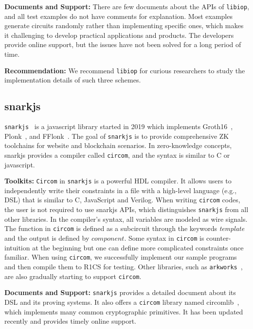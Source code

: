 \documentclass[letterpaper,twocolumn,10pt]{article}
\theoremstyle{definition}
\newcommand{\mypara}[1]{\noindent\textbf{{#1: }}}
\newcommand{\zk}{\text{zk-SNARK}\xspace}
\newcommand{\new}[1]{{#1}\xspace}
\newcommand{\lib}[1]{\texttt{#1}\xspace}
\begin{document}
\mypara{Documents and Support} There are few documents about the APIs of \lib{libiop}, and all test examples do not have comments for explanation. Most examples generate circuits randomly rather than implementing specific ones, which makes it challenging to develop practical applications and products. The developers provide online support, but the issues have not been solved for a long period of time.

\mypara{Recommendation} We recommend \lib{libiop} for curious researchers to study the implementation details of such three schemes.

\subsection{snarkjs}
\lib{snarkjs}~\cite{snarkjs} is a javascript library started in 2019 which implements Groth16~\cite{groth2016size}, Plonk~\cite{gabizon2019plonk}, and FFlonk~\cite{gabizon2021fflonk}. The goal of \lib{snarkjs} is to provide comprehensive ZK toolchains for website and blockchain scenarios. In zero-knowledge concepts, snarkjs provides a compiler called \texttt{circom}, and the syntax is similar to C or javascript. 

\mypara{Toolkits} \texttt{Circom} in \lib{snarkjs} is a powerful HDL compiler. It allows users to independently write their constraints in a file with a high-level language (e.g., DSL) that is similar to C, JavaScript and Verilog. When writing \texttt{circom} codes, the user is not required to use snarkjs APIs, which distinguishes \lib{snarkjs} from all other \zk libraries. \new{In the compiler's syntax, all variables are modeled as wire signals. The function in \texttt{circom} is defined as a subcircuit through the keywords \textit{template} and the output is defined by $component$. Some syntax in \texttt{circom} is counter-intuition at the beginning but one can define more complicated constraints once familiar.
}
When using \texttt{circom}, we successfully implement our sample programs and then compile them to R1CS for testing. Other \zk libraries, such as \lib{arkworks}~\cite{arkworks}, are also gradually starting to support \texttt{circom}.

\mypara{Documents and Support} \lib{snarkjs} provides a detailed document about its DSL and its proving systems. It also offers a \texttt{circom} library named circomlib~\cite{circomlib}, which implements many common cryptographic primitives. It has been updated recently and provides timely online support.
\end{document}
